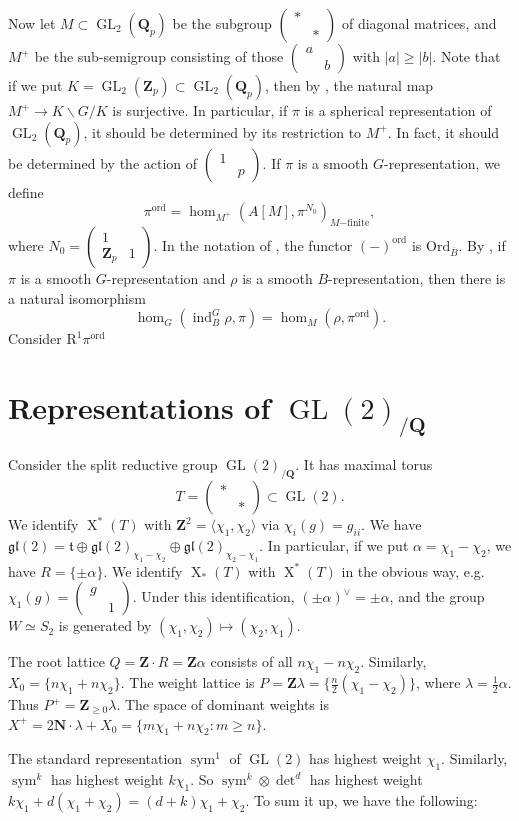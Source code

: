 \documentclass{article}
\DeclareMathOperator{\chars}{X}
\DeclareMathOperator{\GL}{GL}
\newcommand{\gl}{\mathfrak{gl}}
\DeclareMathOperator{\induce}{ind}
\DeclareMathOperator{\symmetric}{sym}
\newcommand{\dN}{\mathbf{N}}
\newcommand{\dQ}{\mathbf{Q}}
\newcommand{\dZ}{\mathbf{Z}}
\newcommand{\eR}{\mathrm{R}}
\newcommand{\ft}{\mathfrak{t}}
\newcommand{\mat}[4]{\begin{pmatrix} #1 & #2 \\ #3 & #4 \end{pmatrix}}
\newcommand{\ordinary}{\mathrm{ord}}
\begin{document}
Now let $M\subset \GL_2(\dQ_p)$ be the subgroup 
$\mat{\ast}{}{}{\ast}$ of diagonal matrices, and $M^+$ be the sub-semigroup 
consisting of those $\mat{a}{}{}{b}$ with $|a|\geqslant |b|$. Note that if we 
put $K=\GL_2(\dZ_p)\subset \GL_2(\dQ_p)$, then by 
\cite[4.6.2]{bump-1997}, the natural map $M^+\to K\backslash G/K$ is 
surjective. In particular, if $\pi$ is a spherical representation of 
$\GL_2(\dQ_p)$, it should be determined by its restriction to $M^+$. In 
fact, it should be determined by the action of $\mat{1}{}{}{p}$. If 
$\pi$ is a smooth $G$-representation, we define 
\[
  \pi^\ordinary=\hom_{M^+}\left(A[M],\pi^{N_0}\right)_{M\mathrm{-finite}} ,
\]
where $N_0=\mat{1}{}{\dZ_p}{1}$. In the 
notation of \cite{emerton-2010-i}, the functor $(-)^\ordinary$ is 
$\mathrm{Ord}_{\overline B}$. By \cite[4.4.6]{emerton-2010-i}, if 
$\pi$ is a smooth $G$-representation and $\rho$ is a smooth $B$-representation, 
then there is a natural isomorphism 
\[
  \hom_G\left(\induce_B^G\rho,\pi\right) = \hom_M\left(\rho,\pi^\ordinary\right) .
\]
Consider $\eR^1 \pi^\ordinary$





\section{Representations of \texorpdfstring{$\GL(2)_{/\dQ}$}{GL(2)/Q}}

Consider the split reductive group $\GL(2)_{/\dQ}$. It has maximal torus 
\[
  T = \mat{\ast}{}{}{\ast} \subset \GL(2) .
\]
We identify $\chars^\ast(T)$ with $\dZ^2=\langle \chi_1,\chi_2\rangle$ via 
$\chi_i(g) = g_{ii}$. We have 
$\gl(2)=\ft\oplus \gl(2)_{\chi_1-\chi_2}\oplus \gl(2)_{\chi_2-\chi_1}$. In 
particular, if we put $\alpha=\chi_1-\chi_2$, we have 
$R=\{\pm \alpha\}$. We identify $\chars_\ast(T)$ with $\chars^\ast(T)$ in the 
obvious way, e.g.~$\chi_1(g)=\mat{g}{}{}{1}$. Under this identification, 
$(\pm \alpha)^\vee=\pm \alpha$, and the group $W\simeq S_2$ is generated by 
$(\chi_1,\chi_2)\mapsto (\chi_2,\chi_1)$. 

The root lattice $Q=\dZ\cdot R=\dZ\alpha$ consists of all $n\chi_1-n\chi_2$. 
Similarly, $X_0=\{n\chi_1+n\chi_2\}$. The weight lattice is 
$P=\dZ\lambda=\{\frac n 2 (\chi_1-\chi_2)\}$, where $\lambda=\frac 1 2 \alpha$. 
Thus $P^+=\dZ_{\geqslant 0} \lambda$. The space of dominant weights is 
$X^+=2\dN\cdot \lambda+X_0=\{m\chi_1+n\chi_2:m\geqslant n\}$. 

The standard representation $\symmetric^1$ of $\GL(2)$ has highest weight 
$\chi_1$. Similarly, $\symmetric^k$ has highest weight $k \chi_1$. So 
$\symmetric^k\otimes \det^d$ has highest weight 
$k\chi_1+d(\chi_1+\chi_2)=(d+k)\chi_1+\chi_2$. To sum it up, we have the 
following: 
\end{document}
